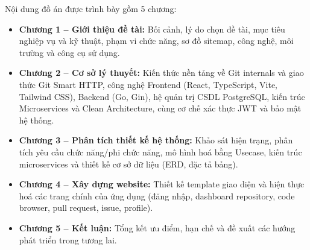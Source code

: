 \hspace{1.2em}Nội dung đồ án được trình bày gồm 5 chương:

\begin{itemize}
\item \textbf{Chương 1 -- Giới thiệu đề tài:} Bối cảnh, lý do chọn đề tài, mục tiêu nghiệp vụ và kỹ thuật, phạm vi chức năng, sơ đồ sitemap, công nghệ, môi trường và công cụ sử dụng.
\item \textbf{Chương 2 -- Cơ sở lý thuyết:} Kiến thức nền tảng về Git internals và giao thức Git Smart HTTP, công nghệ Frontend (React, TypeScript, Vite, Tailwind CSS), Backend (Go, Gin), hệ quản trị CSDL PostgreSQL, kiến trúc Microservices và Clean Architecture, cùng cơ chế xác thực JWT và bảo mật hệ thống.
\item \textbf{Chương 3 -- Phân tích thiết kế hệ thống:} Khảo sát hiện trạng, phân tích yêu cầu chức năng/phi chức năng, mô hình hoá bằng Usecase, kiến trúc microservices và thiết kế cơ sở dữ liệu (ERD, đặc tả bảng).
\item \textbf{Chương 4 -- Xây dựng website:} Thiết kế template giao diện và hiện thực hoá các trang chính của ứng dụng (đăng nhập, dashboard repository, code browser, pull request, issue, profile).
\item \textbf{Chương 5 -- Kết luận:} Tổng kết ưu điểm, hạn chế và đề xuất các hướng phát triển trong tương lai.
\end{itemize}
\clearpage
